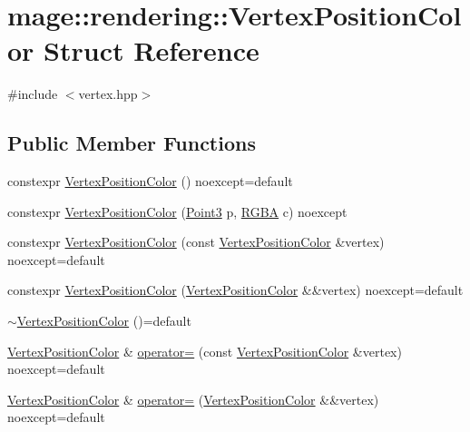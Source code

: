 \hypertarget{structmage_1_1rendering_1_1_vertex_position_color}{}\section{mage\+:\+:rendering\+:\+:Vertex\+Position\+Color Struct Reference}
\label{structmage_1_1rendering_1_1_vertex_position_color}


{\ttfamily \#include $<$vertex.\+hpp$>$}

\subsection*{Public Member Functions}
\begin{DoxyCompactItemize}
\item 
constexpr \mbox{\hyperlink{structmage_1_1rendering_1_1_vertex_position_color_a2491463aecd8969ed33f85b41a0887c5}{Vertex\+Position\+Color}} () noexcept=default
\item 
constexpr \mbox{\hyperlink{structmage_1_1rendering_1_1_vertex_position_color_aee4b12660a3966ebbaf8235eadf0295a}{Vertex\+Position\+Color}} (\mbox{\hyperlink{structmage_1_1_point3}{Point3}} p, \mbox{\hyperlink{structmage_1_1_r_g_b_a}{R\+G\+BA}} c) noexcept
\item 
constexpr \mbox{\hyperlink{structmage_1_1rendering_1_1_vertex_position_color_a4722da066079b70dea70bf892b0652ad}{Vertex\+Position\+Color}} (const \mbox{\hyperlink{structmage_1_1rendering_1_1_vertex_position_color}{Vertex\+Position\+Color}} \&vertex) noexcept=default
\item 
constexpr \mbox{\hyperlink{structmage_1_1rendering_1_1_vertex_position_color_a28e3b4bc9f98e805fc2bfd0553876e15}{Vertex\+Position\+Color}} (\mbox{\hyperlink{structmage_1_1rendering_1_1_vertex_position_color}{Vertex\+Position\+Color}} \&\&vertex) noexcept=default
\item 
\mbox{\hyperlink{structmage_1_1rendering_1_1_vertex_position_color_a80120768659e011119843c29df379e13}{$\sim$\+Vertex\+Position\+Color}} ()=default
\item 
\mbox{\hyperlink{structmage_1_1rendering_1_1_vertex_position_color}{Vertex\+Position\+Color}} \& \mbox{\hyperlink{structmage_1_1rendering_1_1_vertex_position_color_aa5fab5de743c8d810c2ebdf2cd6fcdef}{operator=}} (const \mbox{\hyperlink{structmage_1_1rendering_1_1_vertex_position_color}{Vertex\+Position\+Color}} \&vertex) noexcept=default
\item 
\mbox{\hyperlink{structmage_1_1rendering_1_1_vertex_position_color}{Vertex\+Position\+Color}} \& \mbox{\hyperlink{structmage_1_1rendering_1_1_vertex_position_color_a08948aa9942c9a15e6d325ba95321328}{operator=}} (\mbox{\hyperlink{structmage_1_1rendering_1_1_vertex_position_color}{Vertex\+Position\+Color}} \&\&vertex) noexcept=default
\end{DoxyCompactItemize}
